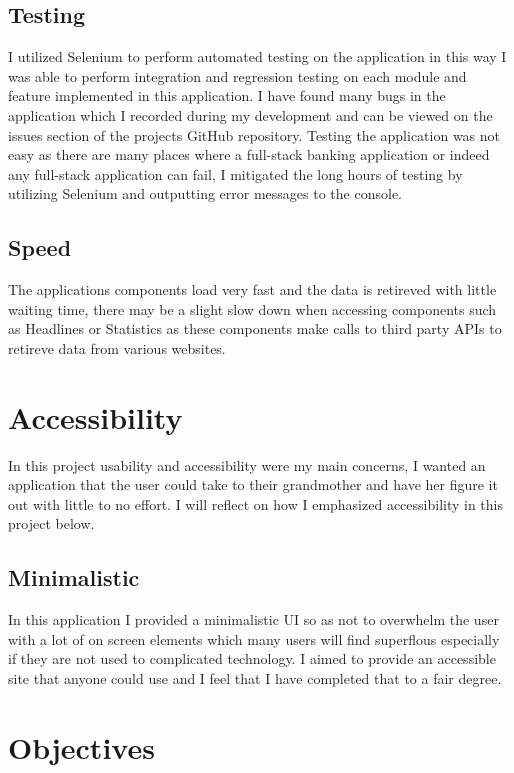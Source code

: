 \subsection{Testing}
I utilized Selenium to perform automated testing on the application in this way I was able to perform
integration and regression testing on each module and feature implemented in this application.  I have
found many bugs in the application which I recorded during my development and can be viewed on the issues section
of the projects GitHub repository.  Testing the application was not easy as there are many places where a full-stack
banking application or indeed any full-stack application can fail, I mitigated the long hours of testing by utilizing
Selenium and outputting error messages to the console.
\subsection{Speed}
The applications components load very fast and the data is retireved with little waiting time, there may be a slight slow down when accessing components such as Headlines or Statistics as these components make calls to third party APIs to retireve data from various websites.
\section{Accessibility}
In this project usability and accessibility were my main concerns, I wanted an application that the user could take to their grandmother and have her figure it out with little to no effort.  I will reflect on how I emphasized accessibility in this project below.
\subsection{Minimalistic}
In this application I provided a minimalistic UI so as not to overwhelm the user
with a lot of on screen elements which many users will find superflous especially
if they are not used to complicated technology.  I aimed to provide an accessible
site that anyone could use and I feel that I have completed that to a fair degree.
\section{Objectives}
